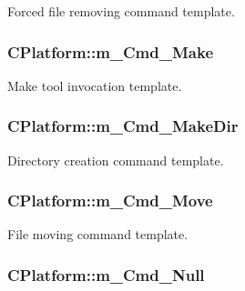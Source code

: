 Forced file removing command template. 

\hypertarget{classCPlatform_aff4c666f1118e9bf8988eb5e0e57c47e}{
\subsubsection[{m\-\_\-\-Cmd\-\_\-\-Make}]{\setlength{\rightskip}{0pt plus 5cm}C\-Platform\-::m\-\_\-\-Cmd\-\_\-\-Make\hspace{0.3cm}{\ttfamily [private]}}}\label{classCPlatform_aff4c666f1118e9bf8988eb5e0e57c47e}


Make tool invocation template. 

\hypertarget{classCPlatform_ad6fb2ef3b64ef90dab2c024dbf1370a5}{
\subsubsection[{m\-\_\-\-Cmd\-\_\-\-Make\-Dir}]{\setlength{\rightskip}{0pt plus 5cm}C\-Platform\-::m\-\_\-\-Cmd\-\_\-\-Make\-Dir\hspace{0.3cm}{\ttfamily [private]}}}\label{classCPlatform_ad6fb2ef3b64ef90dab2c024dbf1370a5}


Directory creation command template. 

\hypertarget{classCPlatform_a97a7eacf6ecb3b7ccfa23cd5d3ef315a}{
\subsubsection[{m\-\_\-\-Cmd\-\_\-\-Move}]{\setlength{\rightskip}{0pt plus 5cm}C\-Platform\-::m\-\_\-\-Cmd\-\_\-\-Move\hspace{0.3cm}{\ttfamily [private]}}}\label{classCPlatform_a97a7eacf6ecb3b7ccfa23cd5d3ef315a}


File moving command template. 

\hypertarget{classCPlatform_afb66cacc7cfde738d92ff375111ed4af}{
\subsubsection[{m\-\_\-\-Cmd\-\_\-\-Null}]{\setlength{\rightskip}{0pt plus 5cm}C\-Platform\-::m\-\_\-\-Cmd\-\_\-\-Null\hspace{0.3cm}{\ttfamily [private]}}}\label{classCPlatform_afb66cacc7cfde738d92ff375111ed4af}


